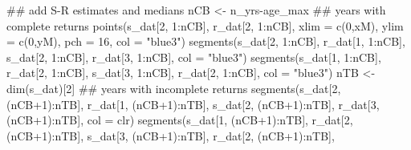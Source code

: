 \documentclass[
  11pt,
]{article}
\newenvironment{Shaded}{}{}
\newcommand{\CommentTok}[1]{\textcolor[rgb]{0.00,0.50,0.00}{#1}}
\newcommand{\DataTypeTok}[1]{#1}
\newcommand{\DecValTok}[1]{#1}
\newcommand{\KeywordTok}[1]{\textcolor[rgb]{0.00,0.00,1.00}{#1}}
\newcommand{\NormalTok}[1]{#1}
\newcommand{\OperatorTok}[1]{#1}
\newcommand{\StringTok}[1]{\textcolor[rgb]{0.00,0.50,0.50}{#1}}
\begin{document}
\begin{Shaded}
\begin{Highlighting}[]
\CommentTok{## add S-R estimates and medians}
\NormalTok{nCB <-}\StringTok{ }\NormalTok{n_yrs}\OperatorTok{-}\NormalTok{age_max}
\CommentTok{## years with complete returns}
\KeywordTok{points}\NormalTok{(s_dat[}\DecValTok{2}\NormalTok{, }\DecValTok{1}\OperatorTok{:}\NormalTok{nCB], r_dat[}\DecValTok{2}\NormalTok{, }\DecValTok{1}\OperatorTok{:}\NormalTok{nCB],}
       \DataTypeTok{xlim =} \KeywordTok{c}\NormalTok{(}\DecValTok{0}\NormalTok{,xM), }\DataTypeTok{ylim =} \KeywordTok{c}\NormalTok{(}\DecValTok{0}\NormalTok{,yM),}
       \DataTypeTok{pch =} \DecValTok{16}\NormalTok{, }\DataTypeTok{col =} \StringTok{"blue3"}\NormalTok{)}
\KeywordTok{segments}\NormalTok{(s_dat[}\DecValTok{2}\NormalTok{, }\DecValTok{1}\OperatorTok{:}\NormalTok{nCB], r_dat[}\DecValTok{1}\NormalTok{, }\DecValTok{1}\OperatorTok{:}\NormalTok{nCB],}
\NormalTok{         s_dat[}\DecValTok{2}\NormalTok{, }\DecValTok{1}\OperatorTok{:}\NormalTok{nCB], r_dat[}\DecValTok{3}\NormalTok{, }\DecValTok{1}\OperatorTok{:}\NormalTok{nCB],}
         \DataTypeTok{col =} \StringTok{"blue3"}\NormalTok{)}
\KeywordTok{segments}\NormalTok{(s_dat[}\DecValTok{1}\NormalTok{, }\DecValTok{1}\OperatorTok{:}\NormalTok{nCB], r_dat[}\DecValTok{2}\NormalTok{, }\DecValTok{1}\OperatorTok{:}\NormalTok{nCB],}
\NormalTok{         s_dat[}\DecValTok{3}\NormalTok{, }\DecValTok{1}\OperatorTok{:}\NormalTok{nCB], r_dat[}\DecValTok{2}\NormalTok{, }\DecValTok{1}\OperatorTok{:}\NormalTok{nCB],}
         \DataTypeTok{col =} \StringTok{"blue3"}\NormalTok{)}
\NormalTok{nTB <-}\StringTok{ }\KeywordTok{dim}\NormalTok{(s_dat)[}\DecValTok{2}\NormalTok{]}
\CommentTok{## years with incomplete returns}
\KeywordTok{segments}\NormalTok{(s_dat[}\DecValTok{2}\NormalTok{, (nCB}\OperatorTok{+}\DecValTok{1}\NormalTok{)}\OperatorTok{:}\NormalTok{nTB], r_dat[}\DecValTok{1}\NormalTok{, (nCB}\OperatorTok{+}\DecValTok{1}\NormalTok{)}\OperatorTok{:}\NormalTok{nTB],}
\NormalTok{         s_dat[}\DecValTok{2}\NormalTok{, (nCB}\OperatorTok{+}\DecValTok{1}\NormalTok{)}\OperatorTok{:}\NormalTok{nTB], r_dat[}\DecValTok{3}\NormalTok{, (nCB}\OperatorTok{+}\DecValTok{1}\NormalTok{)}\OperatorTok{:}\NormalTok{nTB],}
         \DataTypeTok{col =}\NormalTok{ clr)}
\KeywordTok{segments}\NormalTok{(s_dat[}\DecValTok{1}\NormalTok{, (nCB}\OperatorTok{+}\DecValTok{1}\NormalTok{)}\OperatorTok{:}\NormalTok{nTB], r_dat[}\DecValTok{2}\NormalTok{, (nCB}\OperatorTok{+}\DecValTok{1}\NormalTok{)}\OperatorTok{:}\NormalTok{nTB],}
\NormalTok{         s_dat[}\DecValTok{3}\NormalTok{, (nCB}\OperatorTok{+}\DecValTok{1}\NormalTok{)}\OperatorTok{:}\NormalTok{nTB], r_dat[}\DecValTok{2}\NormalTok{, (nCB}\OperatorTok{+}\DecValTok{1}\NormalTok{)}\OperatorTok{:}\NormalTok{nTB],}

\end{Highlighting}
\end{Shaded}
\end{document}
